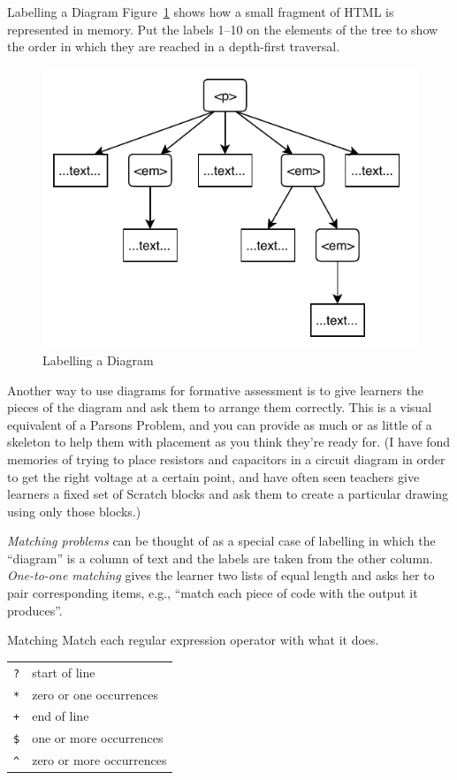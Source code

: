 \begin{aside}{Labelling a Diagram}
  Figure~\ref{f:exercises-labelling} shows how a small fragment of HTML is represented in
  memory. Put the labels 1--10 on the elements of the tree to show the
  order in which they are reached in a depth-first traversal.
\end{aside}

\begin{figure}
\centering
\includegraphics{../../figures/labelling.pdf}
\caption{Labelling a Diagram}
\label{f:exercises-labelling}
\end{figure}

Another way to use diagrams for formative assessment is to give learners
the pieces of the diagram and ask them to arrange them correctly. This
is a visual equivalent of a Parsons Problem, and you can provide as much
or as little of a skeleton to help them with placement as you think
they're ready for. (I have fond memories of trying to place resistors
and capacitors in a circuit diagram in order to get the right voltage at
a certain point, and have often seen teachers give learners a fixed set
of Scratch blocks and ask them to create a particular drawing using only
those blocks.)

\emph{Matching problems} can be thought of as a special case of labelling in
which the ``diagram'' is a column of text and the labels are taken from
the other column. \emph{One-to-one matching} gives the learner two lists of
equal length and asks her to pair corresponding items, e.g., ``match each
piece of code with the output it produces''.

\begin{aside}{Matching}
  Match each regular expression operator with what it does.

  \begin{longtable}[]{@{}ll@{}}
    \texttt{?} & start of line\tabularnewline
    \texttt{*} & zero or one occurrences\tabularnewline
    \texttt{+} & end of line\tabularnewline
    \texttt{\$} & one or more occurrences\tabularnewline
    \texttt{\^{}} & zero or more occurrences\tabularnewline
  \end{longtable}
\end{aside}

